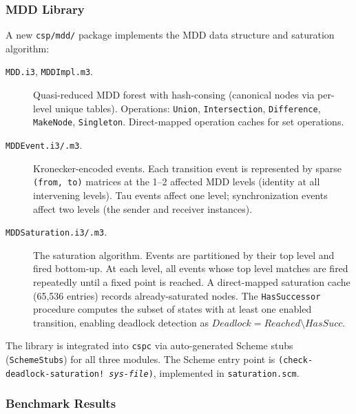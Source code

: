\documentclass[11pt]{article}
\begin{document}
\subsubsection{MDD Library}

A new \texttt{csp/mdd/} package implements the MDD data structure and
saturation algorithm:

\begin{description}
\item[\texttt{MDD.i3}, \texttt{MDDImpl.m3}.]
  Quasi-reduced MDD forest with hash-consing (canonical nodes via
  per-level unique tables).  Operations: \texttt{Union},
  \texttt{Intersection}, \texttt{Difference}, \texttt{MakeNode},
  \texttt{Singleton}.  Direct-mapped operation caches for set
  operations.

\item[\texttt{MDDEvent.i3/.m3}.]
  Kronecker-encoded events.  Each transition event is represented
  by sparse \texttt{(from, to)} matrices at the 1--2 affected MDD
  levels (identity at all intervening levels).  Tau events affect
  one level; synchronization events affect two levels (the sender
  and receiver instances).

\item[\texttt{MDDSaturation.i3/.m3}.]
  The saturation algorithm.  Events are partitioned by their top level
  and fired bottom-up.  At each level, all events whose top level
  matches are fired repeatedly until a fixed point is reached.
  A direct-mapped saturation cache (65,536 entries) records already-saturated
  nodes.  The \texttt{HasSuccessor} procedure computes the subset of
  states with at least one enabled transition, enabling deadlock
  detection as $\mathit{Deadlock} = \mathit{Reached} \setminus
  \mathit{HasSucc}$.
\end{description}

The library is integrated into \texttt{cspc} via auto-generated Scheme
stubs (\texttt{SchemeStubs}) for all three modules.  The Scheme entry
point is \texttt{(check-deadlock-saturation! \textit{sys-file})}, implemented
in \texttt{saturation.scm}.

\subsubsection{Benchmark Results}
\end{document}
